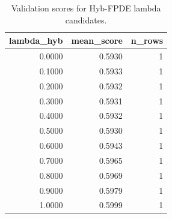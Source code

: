 \begin{table}[t]
\caption{Validation scores for Hyb-FPDE lambda candidates.}
\label{tab:lambda_distribution_computed}
\centering
\begin{tabular}{rrr}
\toprule
lambda\_hyb & mean\_score & n\_rows \\
\midrule
0.0000 & 0.5930 & 1 \\
0.1000 & 0.5933 & 1 \\
0.2000 & 0.5932 & 1 \\
0.3000 & 0.5931 & 1 \\
0.4000 & 0.5932 & 1 \\
0.5000 & 0.5930 & 1 \\
0.6000 & 0.5943 & 1 \\
0.7000 & 0.5965 & 1 \\
0.8000 & 0.5969 & 1 \\
0.9000 & 0.5979 & 1 \\
1.0000 & 0.5999 & 1 \\
\bottomrule
\end{tabular}

\end{table}
